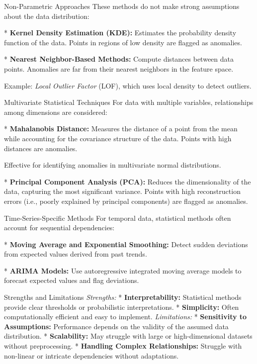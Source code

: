 \secc Non-Parametric Approaches
These methods do not make strong assumptions about the data distribution:

\begitems
* {\bf Kernel Density Estimation (KDE):}\nl
Estimates the probability density function of the data. Points in regions of low density are flagged as anomalies.

* {\bf Nearest Neighbor-Based Methods:}\nl
Compute distances between data points. Anomalies are far from their nearest neighbors in the feature space.

Example: {\em Local Outlier Factor} (LOF), which uses local density to detect outliers.
\enditems

\secc Multivariate Statistical Techniques
For data with multiple variables, relationships among dimensions are considered:

\begitems
* {\bf Mahalanobis Distance:}\nl
Measures the distance of a point from the mean while accounting for the covariance structure of the data. Points with high distances are anomalies.


Effective for identifying anomalies in multivariate normal distributions.


* {\bf Principal Component Analysis (PCA):}\nl
Reduces the dimensionality of the data, capturing the most significant variance. Points with high reconstruction errors (i.e., poorly explained by principal components) are flagged as anomalies.
\enditems

\secc Time-Series-Specific Methods
For temporal data, statistical methods often account for sequential dependencies:

\begitems
* {\bf Moving Average and Exponential Smoothing:}\nl
Detect sudden deviations from expected values derived from past trends.

* {\bf ARIMA Models:}\nl
Use autoregressive integrated moving average models to forecast expected values and flag deviations.
\enditems

\secc Strengths and Limitations
{\em Strengths:}
\begitems
 * {\bf Interpretability:} Statistical methods provide clear thresholds or probabilistic interpretations.
* {\bf Simplicity:} Often computationally efficient and easy to implement.
\enditems
{\em Limitations:}
\begitems
* {\bf Sensitivity to Assumptions:} Performance depends on the validity of the assumed data distribution.
* {\bf Scalability:} May struggle with large or high-dimensional datasets without preprocessing.
* {\bf Handling Complex Relationships:} Struggle with non-linear or intricate dependencies without adaptations.
\enditems

